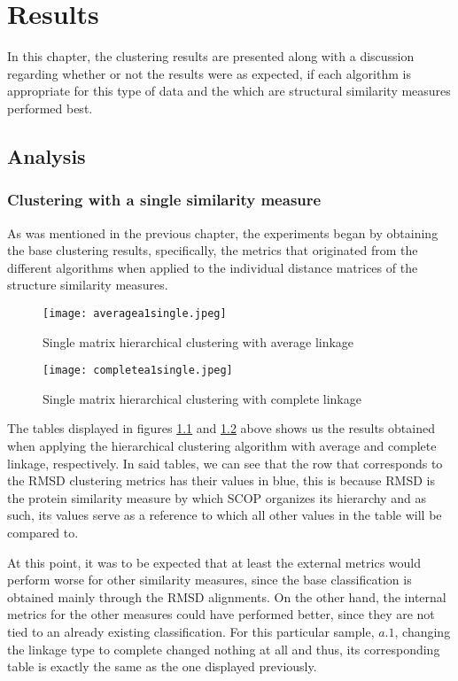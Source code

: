 \chapter{Results}

In this chapter, the clustering results are presented along with a discussion regarding whether or not the results were as expected, if each algorithm is appropriate for this type of data and the which are structural similarity measures performed best.

\section{Analysis}

\subsection{Clustering with a single similarity measure}

As was mentioned in the previous chapter, the experiments began by obtaining the base clustering results, specifically, the metrics that originated from the different algorithms when applied to the individual distance matrices of the structure similarity measures.

\begin{figure}[htbp]
	\centering
	\texttt{[image: averagea1single.jpeg]}
	\caption{Single matrix hierarchical clustering with average linkage}
	\label{fig:singlematrixaverage}
\end{figure}

\begin{figure}[htbp]
	\centering
	\texttt{[image: completea1single.jpeg]}
	\caption{Single matrix hierarchical clustering with complete linkage}
	\label{fig:singlematrixcomplete}
\end{figure}

The tables displayed in figures \ref{fig:singlematrixaverage} and \ref{fig:singlematrixcomplete} above shows us the results obtained when applying the hierarchical clustering algorithm with average and complete linkage, respectively. In said tables, we can see that the row that corresponds to the RMSD clustering metrics has their values in blue, this is because RMSD is the protein similarity measure by which SCOP organizes its hierarchy and as such, its values serve as a reference to which all other values in the table will be compared to. 

At this point, it was to be expected that at least the external metrics would perform worse for other similarity measures, since the base classification is obtained mainly through the RMSD alignments. On the other hand, the internal metrics for the other measures could have performed better, since they are not tied to an already existing classification. For this particular sample, $a.1$, changing the linkage type to complete changed nothing at all and thus, its corresponding table is exactly the same as the one displayed previously.

